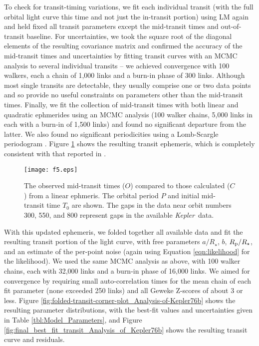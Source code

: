 \documentclass[manuscript]{aastex62}
\newcommand{\kepler}{{\it Kepler}}
\begin{document}
To check for transit-timing variations, we fit each individual transit (with the full orbital light curve this time and not just the in-transit portion) using LM again and held fixed all transit parameters except the mid-transit times and out-of-transit baseline. For uncertainties, we took the square root of the diagonal elements of the resulting covariance matrix \citep[p.~790]{Press:2007:NRE:1403886} and confirmed the accuracy of the mid-transit times and uncertainties by fitting transit curves with an MCMC analysis \citep{2013PASP..125..306F} to several individual transits -- we achieved convergence with 100 walkers, each a chain of 1,000 links and a burn-in phase of 300 links. Although most single transits are detectable, they usually comprise one or two data points and so provide no useful constraints on parameters other than the mid-transit times. Finally, we fit the collection of mid-transit times with both linear and quadratic ephmerides using an MCMC analysis (100 walker chains, 5,000 links in each with a burn-in of 1,500 links) and found no significant departure from the latter. We also found no significant periodicities using a Lomb-Scargle periodogram \citep{1976Ap&SS..39..447L, 1982ApJ...263..835S}. Figure \ref{fig:TTVs_Analysis_of_Kepler76b} shows the resulting transit ephemeris, which is completely consistent with that reported in \citet{2013ApJ...771...26F}. 

\begin{figure}
    \texttt{[image: f5.eps]}
    \caption{The observed mid-transit times ($O$) compared to those calculated ($C$) from a linear ephmeris. The orbital period $P$ and initial mid-transit time $T_0$ are shown. The gaps in the data near orbit numbers 300, 550, and 800 represent gaps in the available \kepler\ data.\label{fig:TTVs_Analysis_of_Kepler76b}}
\end{figure}

With this updated ephemeris, we folded together all available data and fit the resulting transit portion of the light curve, with free parameters $a/R_\star$, $b$, $R_{\rm p}/R_\star$, and an estimate of the per-point noise (again using Equation \ref{eqn:likelihood} for the likelihood). We used the same MCMC analysis as above, with 100 walker chains, each with 32,000 links and a burn-in phase of 16,000 links. We aimed for convergence by requiring small auto-correlation times \citep[e.g.,][]{geyer1992} for the mean chain of each fit parameter (none exceeded 250 links) and all Geweke Z-scores \citep{Geweke92evaluatingthe} of about 3 or less. Figure \ref{fig:folded-transit-corner-plot_Analysis-of-Kepler76b} shows the resulting parameter distributions, with the best-fit values and uncertainties given in Table \ref{tbl:Model_Parameters}, and Figure \ref{fig:final_best_fit_transit_Analysis_of_Kepler76b} shows the resulting transit curve and residuals.
\end{document}
